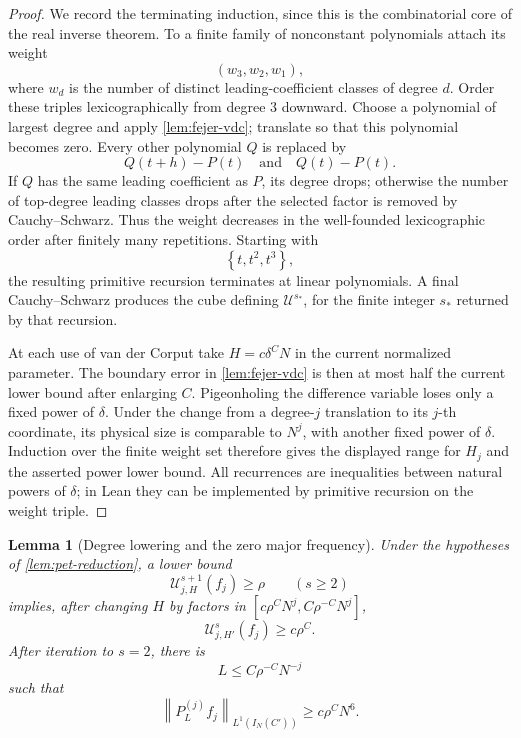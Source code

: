 \documentclass[11pt]{article}
\newtheorem{lemma}[theorem]{Lemma}
\newcommand{\norm}[2]{\left\lVert #1\right\rVert_{#2}}
\newcommand{\set}[1]{\left\{#1\right\}}
\begin{document}
	\begin{proof}
		We record the terminating induction, since this is the combinatorial core of the real inverse theorem.  To a finite family of nonconstant polynomials attach its weight
		\[
		(w_3,w_2,w_1),
		\]
		where \(w_d\) is the number of distinct leading-coefficient classes of degree \(d\).  Order these triples lexicographically from degree \(3\) downward.  Choose a polynomial of largest degree and apply \cref{lem:fejer-vdc}; translate so that this polynomial becomes zero.  Every other polynomial \(Q\) is replaced by
		\[
		Q(t+h)-P(t)
		\quad\text{and}\quad
		Q(t)-P(t).
		\]
		If \(Q\) has the same leading coefficient as \(P\), its degree drops; otherwise the number of top-degree leading classes drops after the selected factor is removed by Cauchy--Schwarz.  Thus the weight decreases in the well-founded lexicographic order after finitely many repetitions.  Starting with
		\[
		\set{t,t^2,t^3},
		\]
		the resulting primitive recursion terminates at linear polynomials.  A final Cauchy--Schwarz produces the cube defining
		\(\mathcal U^{s_\ast}\), for the finite integer \(s_\ast\) returned by that recursion.
		
		At each use of van der Corput take
		\(H=c\delta^{C}N\) in the current normalized parameter.  The boundary error in
		\cref{lem:fejer-vdc} is then at most half the current lower bound after enlarging \(C\).  Pigeonholing the difference variable loses only a fixed power of \(\delta\).  Under the change from a degree-\(j\) translation to its \(j\)-th coordinate, its physical size is comparable to \(N^j\), with another fixed power of \(\delta\).  Induction over the finite weight set therefore gives the displayed range for \(H_j\) and the asserted power lower bound.  All recurrences are inequalities between natural powers of \(\delta\); in Lean they can be implemented by primitive recursion on the weight triple.
	\end{proof}
	
	\begin{lemma}[Degree lowering and the zero major frequency]\label{lem:degree-lowering-zero}
		Under the hypotheses of \cref{lem:pet-reduction}, a lower bound
		\[
		\mathcal U^{s+1}_{j,H}(f_j)\geq\rho
		\qquad(s\geq2)
		\]
		implies, after changing \(H\) by factors in
		\([c\rho^CN^j,C\rho^{-C}N^j]\),
		\[
		\mathcal U^s_{j,H'}(f_j)\geq c\rho^C.
		\]
		After iteration to \(s=2\), there is
		\[
		L\leq C\rho^{-C}N^{-j}
		\]
		such that
		\[
		\norm{P_L^{(j)}f_j}{L^1(I_N(C'))}\geq c\rho^CN^6.
		\]
	\end{lemma}
	
\end{document}
